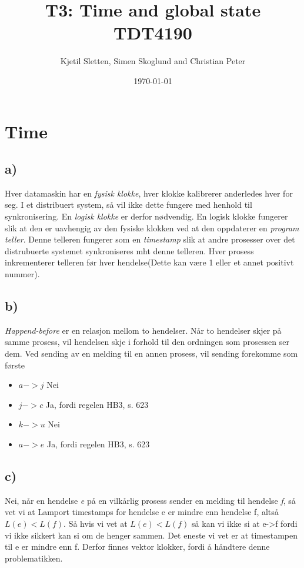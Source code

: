 \documentclass{article}
\begin{document}
\title{T3: Time and global state\\TDT4190}
\author{Kjetil Sletten, Simen Skoglund and Christian Peter}
\date{\today}
\maketitle
\section{Time}
\subsection*{a)}
Hver datamaskin har en \emph{fysisk klokke}, hver klokke kalibrerer anderledes hver for seg. I et distribuert system, så vil ikke dette fungere med henhold til synkronisering. En \emph{logisk klokke} er derfor nødvendig. En logisk klokke fungerer slik at den er uavhengig av den fysiske klokken ved at den oppdaterer en \emph{program teller}. Denne telleren fungerer som en \emph{timestamp} slik at andre prosesser over det distrubuerte systemet synkroniseres mht denne telleren. Hver prosess inkrementerer telleren før hver hendelse(Dette kan være 1 eller et annet positivt nummer).

\subsection*{b)}
\emph{Happend-before} er en relasjon mellom to hendelser. Når to hendelser skjer på samme prosess, vil hendelsen skje i forhold til den ordningen som prosessen ser dem. Ved sending av en melding til en annen prosess, vil sending forekomme som første 
\begin{itemize}
	\item $a -> j$ Nei
	\item $j -> c$ Ja, fordi regelen HB3, s. 623
	\item $k -> u$ Nei
	\item $a -> e$ Ja, fordi regelen HB3, s. 623
\end{itemize}
\subsection*{c)}
Nei, når en hendelse \emph{e} på en vilkårlig prosess sender en melding til hendelse \emph{f}, så vet vi at Lamport timestamps for hendelse e er mindre enn hendelse f, altså $L(e) < L(f)$. Så hvis vi vet at $L(e) < L(f)$ så kan vi ikke si at e->f fordi vi ikke sikkert kan si om de henger sammen. Det eneste vi vet er at timestampen til e er mindre enn f. Derfor finnes vektor klokker, fordi å håndtere denne problematikken. 
\end{document}
